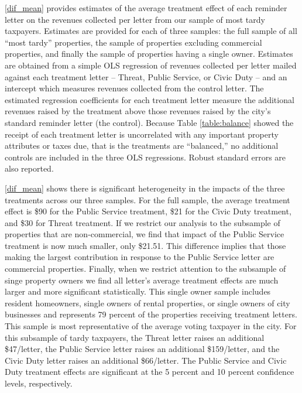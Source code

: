 \documentclass[12pt,titlepage]{article}
\begin{document}
\ref{dif_mean} provides estimates of the average treatment effect 
of each reminder letter on the revenues collected per letter from 
our sample of most tardy taxpayers.   Estimates are provided for 
each of three samples:  the full sample of all “most tardy” 
properties, the sample of properties excluding commercial 
properties, and finally the sample of properties having a single 
owner.  Estimates are obtained from a simple OLS regression of 
revenues collected per letter mailed against each treatment 
letter – Threat, Public Service, or Civic Duty – and an intercept 
which measures revenues collected from the control letter.  
The estimated regression coefficients for each treatment letter 
measure the additional revenues raised by the treatment above 
those revenues raised by the city’s standard reminder letter 
(the control).  Because Table \ref{table:balance} showed the receipt of each 
treatment letter is uncorrelated with any important property 
attributes or taxes due, that is the treatments are “balanced,” 
no additional controls are included in the three OLS regressions.   
Robust standard errors are also reported.   	
	
\ref{dif_mean} shows there is significant heterogeneity in the 
impacts of the three treatments across our three samples.  For 
the full sample, the average treatment effect is \$90 for the 
Public Service treatment, \$21 for the Civic Duty treatment, and 
\$30 for Threat treatment.   If we restrict our analysis to the 
subsample of properties that are non-commercial, we find that 
impact of the Public Service treatment is now much smaller, only 
\$21.51.  This difference implies that those making the largest 
contribution in response to the Public Service letter are 
commercial properties.  Finally, when we restrict attention to 
the subsample of singe property owners we find all letter’s 
average treatment effects are much larger and more significant 
statistically.  This single owner sample includes resident 
homeowners, single owners of rental properties, or single owners 
of city businesses and represents 79 percent of the properties 
receiving treatment letters.  This sample is most representative 
of the average voting taxpayer in the city.   For this subsample 
of tardy taxpayers, the Threat letter raises an additional 
\$47/letter, the Public Service letter raises an additional 
\$159/letter, and the Civic Duty letter raises an additional 
\$66/letter. The Public Service and Civic Duty treatment effects 
are significant at the 5 percent and 10 percent confidence levels, respectively.  
\end{document}
